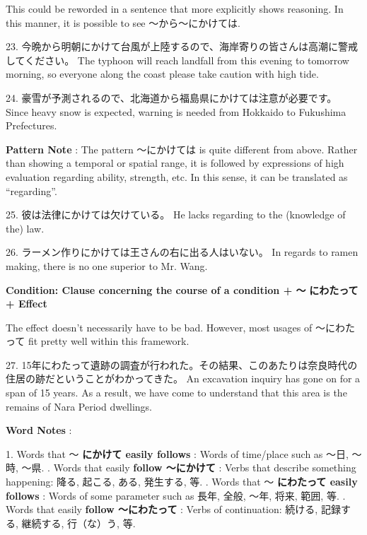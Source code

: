 \par{ This could be reworded in a sentence that more explicitly shows reasoning. In this manner, it is possible to see ～から～にかけては. }

\par{23. 今晩から明朝にかけて台風が上陸するので、海岸寄りの皆さんは高潮に警戒してください。 \hfill\break
The typhoon will reach landfall from this evening to tomorrow morning, so everyone along the coast please take caution with high tide. }

\par{24. 豪雪が予測されるので、北海道から福島県にかけては注意が必要です。 \hfill\break
Since heavy snow is expected, warning is needed from Hokkaido to Fukushima Prefectures. }

\par{\textbf{Pattern Note }: The pattern ～にかけては is quite different from above. Rather than showing a temporal or spatial range, it is followed by expressions of high evaluation regarding ability, strength, etc. In this sense, it can be translated as “regarding”. }

\par{25. 彼は法律にかけては欠けている。 \hfill\break
He lacks regarding to the (knowledge of the) law. }

\par{26. ラーメン作りにかけては王さんの右に出る人はいない。 \hfill\break
In regards to ramen making, there is no one superior to Mr. Wang. }

\par{\textbf{Condition: Clause concerning the course of a condition + ～ }\textbf{にわたって + Effect }\textbf{ }}

\par{ The effect doesn't necessarily have to be bad. However, most usages of ～にわたって fit pretty well within this framework. }

\par{27. 15年にわたって遺跡の調査が行われた。その結果、このあたりは奈良時代の住居の跡だということがわかってきた。 \hfill\break
An excavation inquiry has gone on for a span of 15 years. As a result, we have come to understand that this area is the remains of Nara Period dwellings. }

\par{\textbf{Word Notes }:  }

\par{1. Words that ～ \textbf{にかけて easily follows }: Words of time\slash place such as ～日, ～時, ～県. \hfill{}. Words that easily \textbf{follow ～にかけて }: Verbs that describe something happening: 降る, 起こる, ある, 発生する, 等. \hfill{}. Words that ～ \textbf{にわたって easily follows }: Words of some parameter such as 長年, 全般, ～年, 将来, 範囲, 等. \hfill{}. Words that easily \textbf{follow ～にわたって }: Verbs of continuation: 続ける, 記録する, 継続する, 行（な）う, 等. }
    